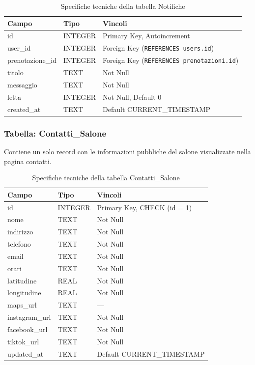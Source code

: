 \documentclass[12pt,a4paper]{article}
\begin{document}
\begin{table}[h!]
\centering
\vspace{0.4cm}
\begin{tabular}{lll}
    \toprule
    \textbf{Campo} & \textbf{Tipo} & \textbf{Vincoli} \\
    \midrule
    id                & INTEGER & Primary Key, Autoincrement \\
    user\_id          & INTEGER & Foreign Key (\texttt{REFERENCES users.id}) \\
    prenotazione\_id  & INTEGER & Foreign Key (\texttt{REFERENCES prenotazioni.id}) \\
    titolo            & TEXT    & Not Null \\
    messaggio         & TEXT    & Not Null \\
    letta             & INTEGER & Not Null, Default 0 \\
    created\_at       & TEXT    & Default CURRENT\_TIMESTAMP \\
    \bottomrule
\end{tabular}
\caption{Specifiche tecniche della tabella Notifiche}
\end{table}

\newpage

\subsubsection{Tabella: Contatti\_Salone}
Contiene un solo record con le informazioni pubbliche del salone visualizzate nella pagina contatti.

\begin{table}[h!]
\centering
\vspace{0.4cm}
\begin{tabular}{lll}
    \toprule
    \textbf{Campo} & \textbf{Tipo} & \textbf{Vincoli} \\
    \midrule
    id             & INTEGER & Primary Key, CHECK (id = 1) \\
    nome           & TEXT    & Not Null \\
    indirizzo      & TEXT    & Not Null \\
    telefono       & TEXT    & Not Null \\
    email          & TEXT    & Not Null \\
    orari          & TEXT    & Not Null \\
    latitudine     & REAL    & Not Null \\
    longitudine    & REAL    & Not Null \\
    maps\_url      & TEXT    & --- \\
    instagram\_url & TEXT    & Not Null \\
    facebook\_url  & TEXT    & Not Null \\
    tiktok\_url    & TEXT    & Not Null \\
    updated\_at    & TEXT    & Default CURRENT\_TIMESTAMP \\
    \bottomrule
\end{tabular}
\caption{Specifiche tecniche della tabella Contatti\_Salone}
\end{table}
\end{document}
